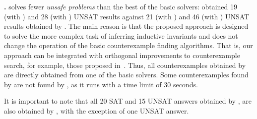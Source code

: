 \textbf{\theringenCICI{}.} \theringenCICI{} solves fewer \textit{unsafe problems} than the best of the basic solvers: \theringenCICI{} obtained 19 (with \cvc{}) and 28 (with \vampire{}) UNSAT results against 21 (with \cvc{}) and 46 (with \vampire{}) UNSAT results obtained by \theringen{}. The main reason is that the proposed approach is designed to solve the more complex task of inferring inductive invariants and does not change the operation of the basic counterexample finding algorithms. That is, our approach can be integrated with orthogonal improvements to counterexample search, for example, those proposed in~\cite{blicha2022transition}. Thus, all counterexamples obtained by \theringenCICI{} are directly obtained from one of the basic solvers. Some counterexamples found by \theringen{} are not found by \theringenCICI{}, as it runs \theringen{} with a time limit of 30 seconds.

It is important to note that all 20 SAT and 15 UNSAT answers obtained by \racer{}, are also obtained by \theringenCICI{}, with the exception of one UNSAT answer.


